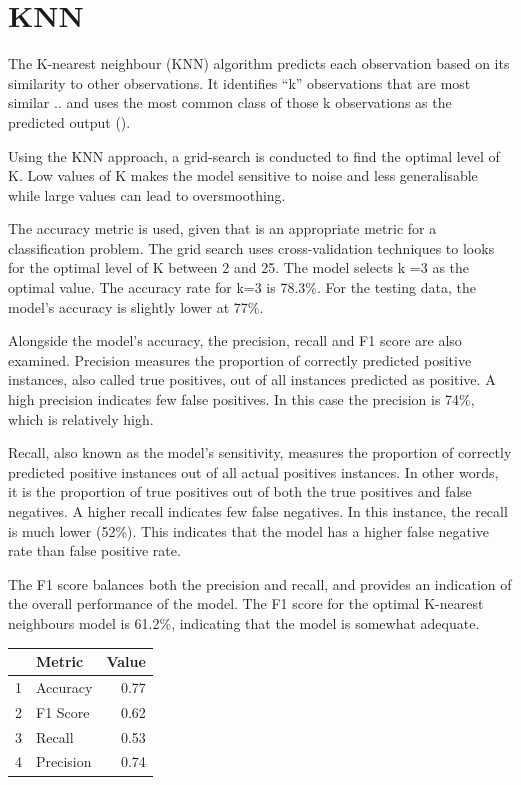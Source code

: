 \documentclass[11pt,preprint, authoryear]{elsarticle}
\let\origtable\table
\let\endorigtable\endtable
\renewenvironment{table}[1][2] {
    \expandafter\origtable\expandafter[H]
} {
    \endorigtable
}
\numberwithin{equation}{section}
\numberwithin{figure}{section}
\numberwithin{table}{section}
\begin{document}
\hypertarget{knn}{%
\section*{KNN}\label{knn}}

The K-nearest neighbour (KNN) algorithm predicts each observation based
on its similarity to other observations. It identifies ``k''
observations that are most similar .. and uses the most common class of
those k observations as the predicted output ().

Using the KNN approach, a grid-search is conducted to find the optimal
level of K. Low values of K makes the model sensitive to noise and less
generalisable while large values can lead to oversmoothing.

The accuracy metric is used, given that is an appropriate metric for a
classification problem. The grid search uses cross-validation techniques
to looks for the optimal level of K between 2 and 25. The model selects
k =3 as the optimal value. The accuracy rate for k=3 is 78.3\%. For the
testing data, the model's accuracy is slightly lower at 77\%.

Alongside the model's accuracy, the precision, recall and F1 score are
also examined. Precision measures the proportion of correctly predicted
positive instances, also called true positives, out of all instances
predicted as positive. A high precision indicates few false positives.
In this case the precision is 74\%, which is relatively high.

Recall, also known as the model's sensitivity, measures the proportion
of correctly predicted positive instances out of all actual positives
instances. In other words, it is the proportion of true positives out of
both the true positives and false negatives. A higher recall indicates
few false negatives. In this instance, the recall is much lower (52\%).
This indicates that the model has a higher false negative rate than
false positive rate.

The F1 score balances both the precision and recall, and provides an
indication of the overall performance of the model. The F1 score for the
optimal K-nearest neighbours model is 61.2\%, indicating that the model
is somewhat adequate.

\begin{table}[H]
\centering
\begin{tabular}{rlr}
  \hline
 & Metric & Value \\ 
  \hline
1 & Accuracy & 0.77 \\ 
  2 & F1 Score & 0.62 \\ 
  3 & Recall & 0.53 \\ 
  4 & Precision & 0.74 \\ 
   \hline
\end{tabular}
\caption{Metrics for KNN \label{tab1}} 
\end{table}
\end{document}
